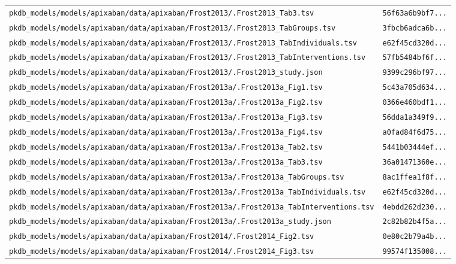 \begin{longtable}{ll}
\texttt{pkdb\_models/models/apixaban/data/apixaban/Frost2013/.Frost2013\_Tab3.tsv} & \texttt{56f63a6b9bf7...} \\
\texttt{pkdb\_models/models/apixaban/data/apixaban/Frost2013/.Frost2013\_TabGroups.tsv} & \texttt{3fbcb6adca6b...} \\
\texttt{pkdb\_models/models/apixaban/data/apixaban/Frost2013/.Frost2013\_TabIndividuals.tsv} & \texttt{e62f45cd320d...} \\
\texttt{pkdb\_models/models/apixaban/data/apixaban/Frost2013/.Frost2013\_TabInterventions.tsv} & \texttt{57fb5484bf6f...} \\
\texttt{pkdb\_models/models/apixaban/data/apixaban/Frost2013/.Frost2013\_study.json} & \texttt{9399c296bf97...} \\
\texttt{pkdb\_models/models/apixaban/data/apixaban/Frost2013a/.Frost2013a\_Fig1.tsv} & \texttt{5c43a705d634...} \\
\texttt{pkdb\_models/models/apixaban/data/apixaban/Frost2013a/.Frost2013a\_Fig2.tsv} & \texttt{0366e460bdf1...} \\
\texttt{pkdb\_models/models/apixaban/data/apixaban/Frost2013a/.Frost2013a\_Fig3.tsv} & \texttt{56dda1a349f9...} \\
\texttt{pkdb\_models/models/apixaban/data/apixaban/Frost2013a/.Frost2013a\_Fig4.tsv} & \texttt{a0fad84f6d75...} \\
\texttt{pkdb\_models/models/apixaban/data/apixaban/Frost2013a/.Frost2013a\_Tab2.tsv} & \texttt{5441b03444ef...} \\
\texttt{pkdb\_models/models/apixaban/data/apixaban/Frost2013a/.Frost2013a\_Tab3.tsv} & \texttt{36a01471360e...} \\
\texttt{pkdb\_models/models/apixaban/data/apixaban/Frost2013a/.Frost2013a\_TabGroups.tsv} & \texttt{8ac1ffea1f8f...} \\
\texttt{pkdb\_models/models/apixaban/data/apixaban/Frost2013a/.Frost2013a\_TabIndividuals.tsv} & \texttt{e62f45cd320d...} \\
\texttt{pkdb\_models/models/apixaban/data/apixaban/Frost2013a/.Frost2013a\_TabInterventions.tsv} & \texttt{4ebdd262d230...} \\
\texttt{pkdb\_models/models/apixaban/data/apixaban/Frost2013a/.Frost2013a\_study.json} & \texttt{2c82b82b4f5a...} \\
\texttt{pkdb\_models/models/apixaban/data/apixaban/Frost2014/.Frost2014\_Fig2.tsv} & \texttt{0e80c2b79a4b...} \\
\texttt{pkdb\_models/models/apixaban/data/apixaban/Frost2014/.Frost2014\_Fig3.tsv} & \texttt{99574f135008...} \\

\end{longtable}
